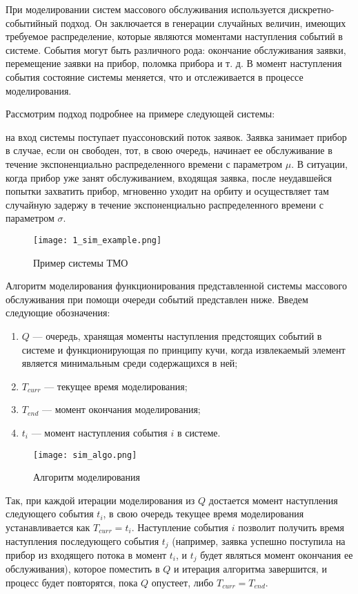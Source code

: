 При моделировании систем массового обслуживания используется дискретно-событийный подход. Он заключается в генерации случайных величин, имеющих требуемое распределение, которые являются моментами наступления событий в системе. События могут быть различного рода: окончание обслуживания заявки, перемещение заявки на прибор, поломка прибора и т. д. В момент наступления события состояние системы меняется, что и отслеживается в процессе моделирования.

Рассмотрим подход подробнее на примере следующей системы:

на вход системы поступает пуассоновский поток заявок. Заявка занимает прибор в случае, если он свободен, тот, в свою очередь, начинает ее обслуживание в течение экспоненциально распределенного времени с параметром $\mu$. В ситуации, когда прибор уже занят обслуживанием, входящая заявка, после неудавшейся попытки захватить прибор, мгновенно уходит на орбиту и осуществляет там случайную задержу в течение экспоненциально распределенного времени с параметром $\sigma$.

\begin{figure}[H]
	\centering
	\texttt{[image: 1\_sim\_example.png]}
	\caption{Пример системы ТМО}
	\label{sys_tmo_example}
\end{figure}

Алгоритм моделирования функционирования представленной системы массового обслуживания при помощи очереди событий представлен ниже.
Введем следующие обозначения:
\begin{enumerate}
	\item $Q$ --- очередь, хранящая моменты наступления предстоящих событий в системе и функционирующая по принципу кучи, когда извлекаемый элемент является минимальным среди содержащихся в ней;
	\item $T_{curr}$ --- текущее время моделирования;
	\item $T_{end}$ --- момент окончания моделирования;
	\item $t_i$ --- момент наступления события $i$ в системе. 
	\end{enumerate}

\begin{figure}[H]
	\centering
	\texttt{[image: sim\_algo.png]}
	\caption{Алгоритм моделирования}
	\label{sys_tmo_algo}
\end{figure}

Так, при каждой итерации моделирования из $Q$ достается момент наступления следующего события $t_i$, в свою очередь текущее время моделирования устанавливается как $T_{curr} = t_i$. Наступление события $i$ позволит получить время наступления последующего события $t_j$ (например, заявка успешно поступила на прибор из входящего потока в момент $t_i$, и $t_j$ будет являться момент окончания ее обслуживания), которое поместить в $Q$ и итерация алгоритма завершится, и процесс будет повторятся, пока $Q$ опустеет, либо $T_{curr} = T_{end}$.

